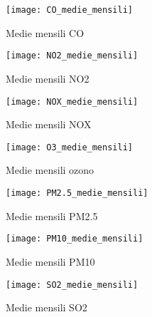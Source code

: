 \begin{figure}
\centering
\texttt{[image: CO\_medie\_mensili]}
\caption{Medie mensili CO}
\label{fig:co_medie_mensili_reali}
\end{figure}

\begin{figure}
\centering
\texttt{[image: NO2\_medie\_mensili]}
\caption{Medie mensili NO2}
\label{fig:no2_medie_mensili_reali}
\end{figure}

\begin{figure}
\centering
\texttt{[image: NOX\_medie\_mensili]}
\caption{Medie mensili NOX}
\label{fig:nox_medie_mensili_reali}
\end{figure}

\begin{figure}
\centering
\texttt{[image: O3\_medie\_mensili]}
\caption{Medie mensili ozono}
\label{fig:o3_medie_mensili_reali}
\end{figure}

\begin{figure}
\centering
\texttt{[image: PM2.5\_medie\_mensili]}
\caption{Medie mensili PM2.5}
\label{fig:pm25_medie_mensili_reali}
\end{figure}

\begin{figure}
\centering
\texttt{[image: PM10\_medie\_mensili]}
\caption{Medie mensili PM10}
\label{fig:pm10_medie_mensili_reali}
\end{figure}

\begin{figure}
\centering
\texttt{[image: SO2\_medie\_mensili]}
\caption{Medie mensili SO2}
\label{fig:so2_medie_mensili_reali}
\end{figure}
